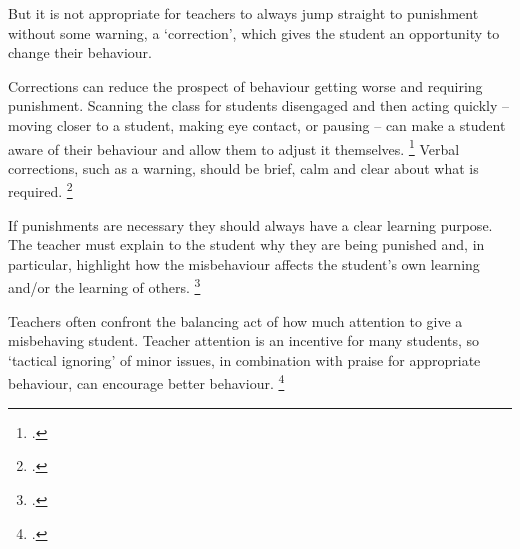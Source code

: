 \documentclass{grattan}
\begin{document}
But it is not appropriate for teachers to always jump straight to punishment without some warning, a `correction', which gives the student an opportunity to change their behaviour.

Corrections can reduce the prospect of behaviour getting worse and requiring punishment. Scanning the class for students disengaged and then acting quickly -- moving closer to a student, making eye contact, or pausing -- can make a student aware of their behaviour and allow them to adjust it themselves.%
    \footcites{Lewis2011DevelopmentalManagementApproach}{Rogers2015ClassroomBehaviourPractical}
Verbal corrections, such as a warning, should be brief, calm and clear about what is required.%
    \footcite{Simonsen2008EvidenceBasedPractices}

If punishments are necessary they should always have a clear learning purpose. The teacher must explain to the student why they are being punished and, in particular, highlight how the misbehaviour affects the student's own learning and/or the learning of others.%
    \footcites{Lewis2011DevelopmentalManagementApproach}{Rogers2015ClassroomBehaviourPractical}

Teachers often confront the balancing act of how much attention to give a misbehaving student. Teacher attention is an incentive for many students, so `tactical ignoring' of minor issues, in combination with praise for appropriate behaviour, can encourage better behaviour.%
    \footcite{Simonsen2008EvidenceBasedPractices}
\end{document}
